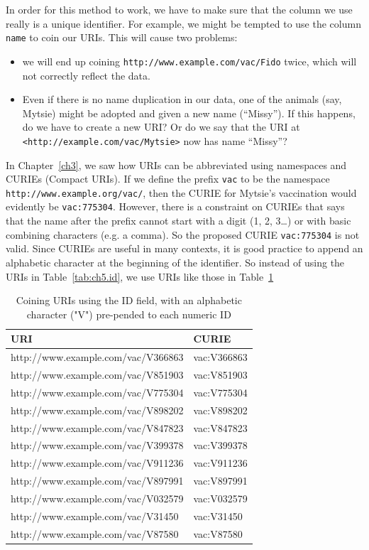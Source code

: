 In order for this method to work, we have to make sure that the column we use really is a unique  identifier. 
For example, we might be tempted to use the column \texttt{name} to coin our URIs.  
This will cause two problems: 

\begin{itemize}
    \item we will end up coining 
\texttt{http://www.example.com/vac/Fido} twice, which will not correctly reflect the data. 
\item Even if there is no  name duplication in our data, one of the animals (say, Mytsie) might be adopted and given a new name (``Missy'').  If this happens, do we have to create a new URI?   Or do we say that the URI at \texttt{<http://example.com/vac/Mytsie>} now has name ``Missy''?
\end{itemize}

In Chapter~\ref{ch3}, we saw how URIs can be abbreviated using namespaces and CURIEs (Compact URIs). 
If we define the prefix \texttt{vac} to be the namespace
\texttt{http://www.example.org/vac/}, then the CURIE for Mytsie's vaccination would evidently   be
\texttt{vac:775304}.   However, there is a constraint on CURIEs \cite{Bray:08:EML} that says that the name after the 
 prefix cannot start with a digit (1, 2,
3\ldots{}) or with basic combining characters (e.g. a comma).  So the proposed CURIE \texttt{vac:775304} is not valid.  Since CURIEs are useful in many contexts, it is good practice to append an alphabetic character at the beginning of the identifier.  So instead of using the URIs in Table~\ref{tab:ch5.id}, we use URIs like those in Table~\ref{tab:ch5.vac}

\begin{table}
    \centering
    \begin{tabular}{|l l|}
    \hline
    URI&CURIE \\
    \hline\hline
http://www.example.com/vac/V366863&vac:V366863 \\
http://www.example.com/vac/V851903&vac:V851903 \\
http://www.example.com/vac/V775304&vac:V775304 \\
http://www.example.com/vac/V898202&vac:V898202 \\
http://www.example.com/vac/V847823&vac:V847823 \\
http://www.example.com/vac/V399378&vac:V399378 \\
http://www.example.com/vac/V911236&vac:V911236 \\
http://www.example.com/vac/V897991&vac:V897991 \\
http://www.example.com/vac/V032579&vac:V032579 \\
http://www.example.com/vac/V31450&vac:V31450 \\
http://www.example.com/vac/V87580&vac:V87580 \\
\hline
    \end{tabular}
    \caption{Coining URIs using the ID field, with an alphabetic character ("V") pre-pended to each numeric ID }
    \label{tab:ch5.vac}
\end{table}

